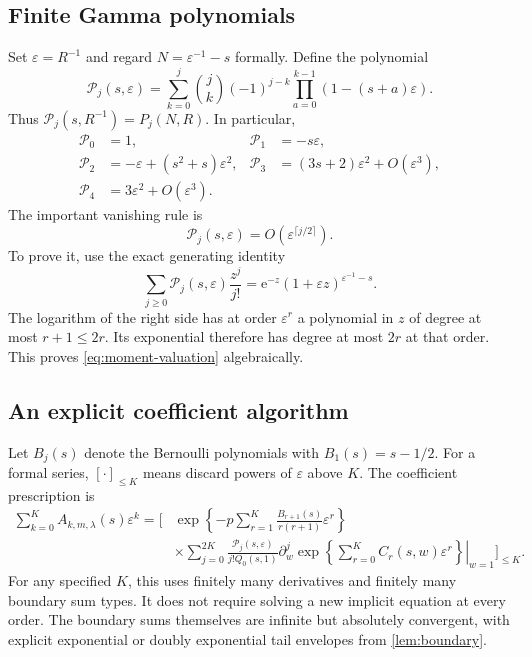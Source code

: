 \documentclass[11pt,a4paper]{article}
\numberwithin{equation}{section}
\theoremstyle{definition}
\newcommand{\ee}{\mathrm e}
\newcommand{\calP}{\mathcal P}
\begin{document}
\subsection{Finite Gamma polynomials}
Set $\varepsilon=R^{-1}$ and regard $N=\varepsilon^{-1}-s$ formally. Define the polynomial
\begin{equation}
 \calP_j(s,\varepsilon)=
 \sum_{k=0}^j\binom jk(-1)^{j-k}
 \prod_{a=0}^{k-1}(1-(s+a)\varepsilon).
 \label{eq:calP}
\end{equation}
Thus $\calP_j(s,R^{-1})=P_j(N,R)$. In particular,
\begin{align}
 \calP_0&=1,&\calP_1&=-s\varepsilon,\nonumber\\
 \calP_2&=-\varepsilon+(s^2+s)\varepsilon^2,&
 \calP_3&=(3s+2)\varepsilon^2+O(\varepsilon^3),\nonumber\\
 \calP_4&=3\varepsilon^2+O(\varepsilon^3).
 \label{eq:lowP}
\end{align}
The important vanishing rule is
\begin{equation}
 \calP_j(s,\varepsilon)=O(\varepsilon^{\lceil j/2\rceil}).
 \label{eq:moment-valuation}
\end{equation}
To prove it, use the exact generating identity
\begin{equation}
 \sum_{j\geq0}\calP_j(s,\varepsilon)\frac{z^j}{j!}
 =\ee^{-z}(1+\varepsilon z)^{\varepsilon^{-1}-s}.
 \label{eq:P-generating}
\end{equation}
The logarithm of the right side has at order $\varepsilon^r$ a polynomial in $z$ of degree at most $r+1\leq2r$. Its exponential therefore has degree at most $2r$ at that order. This proves \eqref{eq:moment-valuation} algebraically.

\subsection{An explicit coefficient algorithm}
Let $B_j(s)$ denote the Bernoulli polynomials with $B_1(s)=s-1/2$. For a formal series, $[\cdot]_{\leq K}$ means discard powers of $\varepsilon$ above $K$. The coefficient prescription is
\begin{equation}
\begin{split}
 \sum_{k=0}^K A_{k,m,\lambda}(s)\varepsilon^k
 =\Bigg[&\exp\left\{-p\sum_{r=1}^K
 \frac{B_{r+1}(s)}{r(r+1)}\varepsilon^r\right\}\\
 &\times\sum_{j=0}^{2K}
 \frac{\calP_j(s,\varepsilon)}{j!Q_0(s,1)}
 \left.\partial_w^j
 \exp\left\{\sum_{r=0}^K C_r(s,w)\varepsilon^r\right\}
 \right|_{w=1}\Bigg]_{\leq K}.
\end{split}
\label{eq:coefficient-algorithm}
\end{equation}
For any specified $K$, this uses finitely many derivatives and finitely many boundary sum types. It does not require solving a new implicit equation at every order. The boundary sums themselves are infinite but absolutely convergent, with explicit exponential or doubly exponential tail envelopes from \cref{lem:boundary}.
\end{document}
